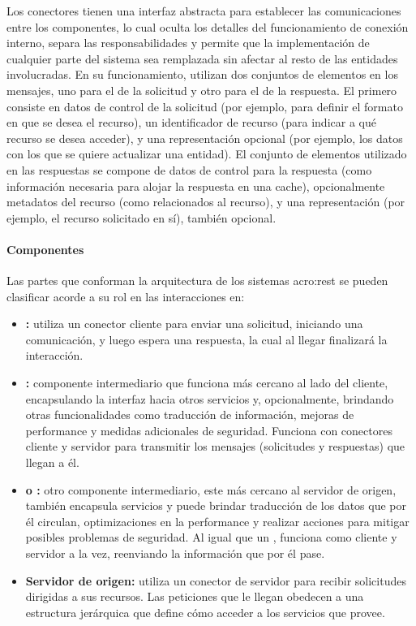 Los conectores tienen una interfaz abstracta para establecer las comunicaciones entre los componentes, lo cual oculta los detalles del funcionamiento de conexión interno, separa las responsabilidades y permite que la implementación de cualquier parte del sistema sea remplazada sin afectar al resto de las entidades involucradas. En su funcionamiento, utilizan dos conjuntos de elementos en los mensajes, uno para el de la solicitud y otro para el de la respuesta. El primero consiste en datos de control de la solicitud (por ejemplo, para definir el formato en que se desea el recurso), un identificador de recurso (para indicar a qué recurso se desea acceder), y una representación opcional (por ejemplo, los datos con los que se quiere actualizar una entidad). El conjunto de elementos utilizado en las respuestas se compone de datos de control para la respuesta (como información necesaria para alojar la respuesta en una cache), opcionalmente metadatos del recurso (como  relacionados al recurso), y una representación (por ejemplo, el recurso solicitado en sí), también opcional.


\paragraph{Componentes}

Las partes que conforman la arquitectura de los sistemas \gls{acro:rest} se pueden clasificar acorde a su rol en las interacciones en:

\begin{itemize}
  \item \textbf{:} utiliza un conector cliente para enviar una solicitud, iniciando una comunicación, y luego espera una respuesta, la cual al llegar finalizará la interacción.

  \item \textbf{:} componente intermediario que funciona más cercano al lado del cliente, encapsulando la interfaz hacia otros servicios y, opcionalmente, brindando otras funcionalidades como traducción de información, mejoras de performance y medidas adicionales de seguridad. Funciona con conectores cliente y servidor para transmitir los mensajes (solicitudes y respuestas) que llegan a él.

  \item \textbf{ o :} otro componente intermediario, este más cercano al servidor de origen, también encapsula servicios y puede brindar traducción de los datos que por él circulan, optimizaciones en la performance y realizar acciones para mitigar posibles problemas de seguridad. Al igual que un , funciona como cliente y servidor a la vez, reenviando la información que por él pase.

  \item \textbf{Servidor de origen:} utiliza un conector de servidor para recibir solicitudes dirigidas a sus recursos. Las peticiones que le llegan obedecen a una estructura jerárquica que define cómo acceder a los servicios que provee.
\end{itemize}


